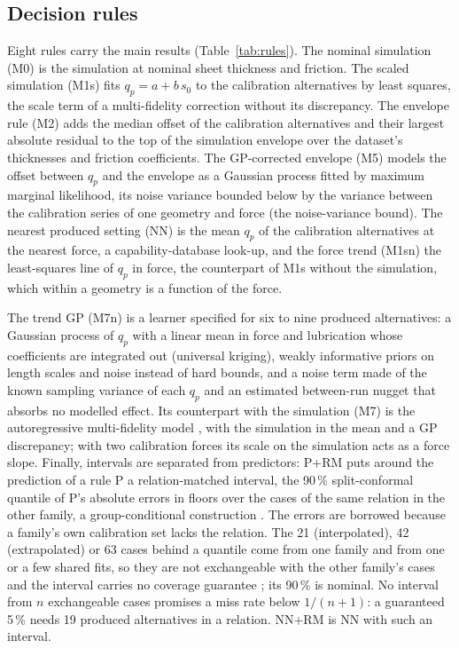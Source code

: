 \documentclass[pdflatex,sn-basic,lineno]{sn-jnl}
\begin{document}
\subsection{Decision rules}\label{sec:rules}

Eight rules carry the main results (Table~\ref{tab:rules}). The nominal simulation (M0) is the simulation at nominal sheet thickness and friction. The scaled simulation (M1s) fits $q_p = a + b\,s_0$ to the calibration alternatives by least squares, the scale term of a multi-fidelity correction without its discrepancy. The envelope rule (M2) adds the median offset of the calibration alternatives and their largest absolute residual to the top of the simulation envelope over the dataset's thicknesses and friction coefficients. The GP-corrected envelope (M5) models the offset between $q_p$ and the envelope as a Gaussian process \citep{rasmussen2006gaussian} fitted by maximum marginal likelihood, its noise variance bounded below by the variance between the calibration series of one geometry and force (the noise-variance bound). The nearest produced setting (NN) is the mean $q_p$ of the calibration alternatives at the nearest force, a capability-database look-up, and the force trend (M1sn) the least-squares line of $q_p$ in force, the counterpart of M1s without the simulation, which within a geometry is a function of the force.

The trend GP (M7n) is a learner specified for six to nine produced alternatives: a Gaussian process of $q_p$ with a linear mean in force and lubrication whose coefficients are integrated out (universal kriging), weakly informative priors on length scales and noise instead of hard bounds, and a noise term made of the known sampling variance of each $q_p$ and an estimated between-run nugget that absorbs no modelled effect. Its counterpart with the simulation (M7) is the autoregressive multi-fidelity model \citep{kennedy2000predicting}, with the simulation in the mean and a GP discrepancy; with two calibration forces its scale on the simulation acts as a force slope. Finally, intervals are separated from predictors: P+RM puts around the prediction of a rule P a relation-matched interval, the 90\,\% split-conformal quantile \citep{lei2018distribution} of P's absolute errors in floors over the cases of the same relation in the other family, a group-conditional construction \citep{vovk2005algorithmic}. The errors are borrowed because a family's own calibration set lacks the relation. The 21 (interpolated), 42 (extrapolated) or 63 cases behind a quantile come from one family and from one or a few shared fits, so they are not exchangeable with the other family's cases and the interval carries no coverage guarantee \citep{barber2023conformal}; its 90\,\% is nominal. No interval from $n$ exchangeable cases promises a miss rate below $1/(n+1)$: a guaranteed 5\,\% needs 19 produced alternatives in a relation. NN+RM is NN with such an interval.
\end{document}
